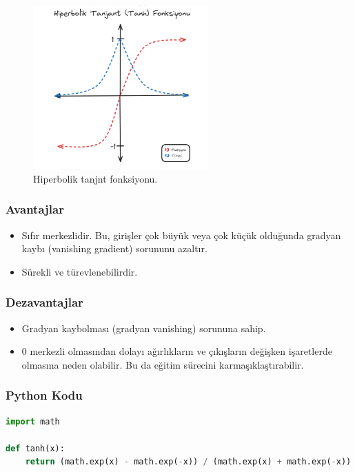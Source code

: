\begin{figure}[h]
    \centering
    \includegraphics[width=0.6\textwidth]{images/tanh_function.png}
    \caption{Hiperbolik tanjnt fonksiyonu.}
    \label{fig:enter-label}
\end{figure}

\subsubsection{Avantajlar}
\begin{itemize}
    \item Sıfır merkezlidir. Bu, girişler çok büyük veya çok küçük olduğunda gradyan kaybı (vanishing gradient) sorununu azaltır.
    \item Sürekli ve türevlenebilirdir.
\end{itemize}

\subsubsection{Dezavantajlar}
\begin{itemize}
    \item Gradyan kaybolması (gradyan vanishing) sorununa sahip.
    \item 0 merkezli olmasından dolayı ağırlıkların ve çıkışların değişken işaretlerde olmasına neden olabilir. Bu da eğitim sürecini karmaşıklaştırabilir.
\end{itemize}

\subsubsection{Python Kodu}

\begin{lstlisting}[language=Python]
import math

def tanh(x):
    return (math.exp(x) - math.exp(-x)) / (math.exp(x) + math.exp(-x))
\end{lstlisting}

